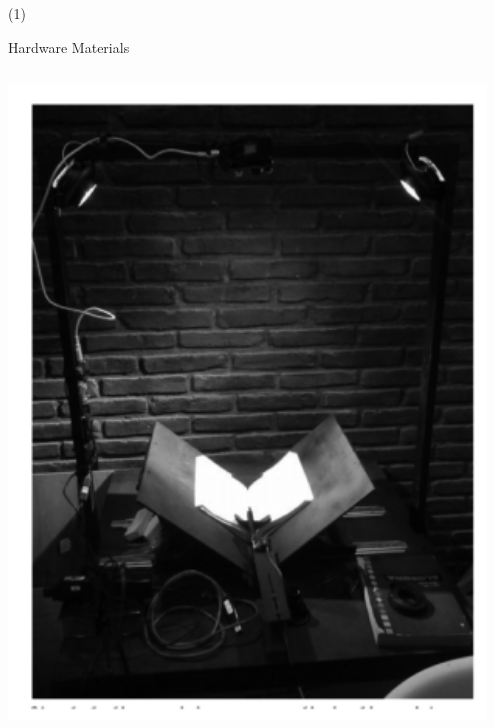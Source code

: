 \begin{frame}{  (1)}
\begin{block}{Hardware Materials}
\begin{columns}
\begin{column}{0.23\textwidth}
          \includegraphics[width=0.95\textwidth]{Figs/BookScanner2}
\end{column}
\end{columns}
\end{block} 
\setcounter{footnote}{0}
\end{frame}


